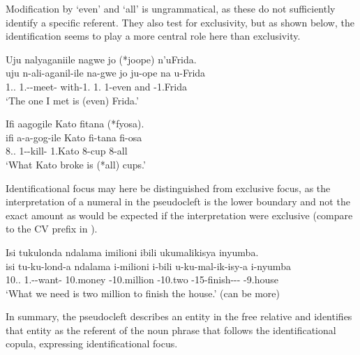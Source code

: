 \documentclass[output=paper]{langscibook}
\begin{document}
\z


Modification by ‘even’  and ‘all’  is ungrammatical, as these do not sufficiently identify a specific referent. They also test for exclusivity, but as shown below, the identification seems to play a more central role here than exclusivity.

\ea
\label{bkm:Ref98084827}
Uju nalyaganiile nagwe jo (*joope) n’uFrida.\\
\gll
uju  n-ali-aganil-ile  na-gwe  jo  ju-ope  na  u-Frida\\
1.\DEM.\PROX{}  1\SG.\SM-\PST{}-meet-\PFV{}  with-1.\PRO{}  1.\IDCOP{}  1-even  and  \AUG{}-1.Frida\\
\glt
‘The one I met is (even) Frida.’\\

\z


\ea
\label{bkm:Ref98084841}
Ifi aagogile Kato fitana (*fyosa).\\
\gll
ifi  a-a-gog-ile  Kato  fi-tana  fi-osa\\
8.\DEM.\PROX{}  1\SM-\PST{}-kill-\PFV{}  1.Kato  8-cup  8-all\\
\glt
‘What Kato broke is (*all) cups.’\\

\z


Identificational focus may here be distinguished from exclusive focus, as the interpretation of a numeral in the pseudocleft is the lower boundary and not the exact amount as would be expected if the interpretation were exclusive (compare to the CV prefix in ).

\ea
Isi tukulonda ndalama imilioni ibili ukumalikisya inyumba.\\
\gll
isi  tu-ku-lond-a  ndalama  i-milioni  i-bili u-ku-mal-ik-isy-a  i-nyumba\\
10.\DEM.\PROX{}  1\PL.\SM-\PRS{}-want-\FV{}  10.money  \AUG{}-10.million  \AUG{}-10.two \AUG{}-15-finish-\STAT-\CAUS-\FV{}  \AUG{}-9.house\\
\glt ‘What we need is two million to finish the house.’ (can be more)

\z

In summary, the pseudocleft describes an entity in the free relative and identifies that entity as the referent of the noun phrase that follows the identificational copula, expressing identificational focus.
\end{document}
